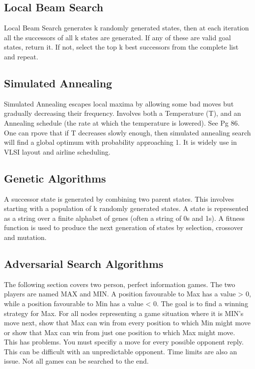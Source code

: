 \documentclass[11pt, oneside]{article}   	%
\begin{document}
\subsection{Local Beam Search}
Local Beam Search generates k randomly generated states, then at each iteration all the successors of all k states are generated. If any of these are valid goal states, return it. If not, select the top k best successors from the complete list and repeat.
\subsection{Simulated Annealing}

Simulated Annealing escapes local maxima by allowing some bad moves but gradually decreasing their frequency. Involves both a Temperature (T), and an Annealing schedule (the rate at which the temperature is lowered). See Pg 86. One can rpove that if T decreases slowly enough, then simulated annealing search will find a global optimum with probability approaching 1. It is widely use in VLSI layout and airline scheduling.

\subsection{Genetic Algorithms}

A successor state is generated by combining two parent states. This involves starting with a population of k randomly generated states. A state is represented as a string over a finite alphabet of genes (often a string of 0s and 1s). A fitness function is used to produce the next generation of states by selection, crossover and mutation.

\subsection{Adversarial Search Algorithms}

The following section covers two person, perfect information games. The two players are named MAX and MIN. A position favourable to Max has a value > 0, while a position favourable to Min has a value < 0. The goal is to find a winning strategy for Max. For all nodes representing a game situation where it is MIN's move next, show that Max can win from every position to which Min might move or show that Max can win from just one position to which Max might move.
\\
This has problems. You must specifiy a move for every possible opponent reply. This can be difficult with an unpredictable opponent. Time limits are also an issue. Not all games can be searched to the end.
\end{document}
